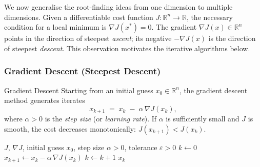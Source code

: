 We now generalise the root-finding ideas from one dimension to multiple dimensions. Given a differentiable cost function $J\colon\mathbb{R}^n\to\mathbb{R}$, the necessary condition for a local minimum is $\nabla J(x^*)=0$. The gradient $\nabla J(x)\in\mathbb{R}^n$ points in the direction of steepest \emph{ascent}; its negative $-\nabla J(x)$ is the direction of steepest \emph{descent}. This observation motivates the iterative algorithms below.

\subsubsection{Gradient Descent (Steepest Descent)}

\begin{defnbox}{Gradient Descent}
	Starting from an initial guess $x_0\in\mathbb{R}^n$, the gradient descent method generates iterates
	\[
	x_{k+1} \;=\; x_k \;-\; \alpha\,\nabla J(x_k),
	\]
	where $\alpha>0$ is the \emph{step size} (or \emph{learning rate}). If $\alpha$ is sufficiently small and $J$ is smooth, the cost decreases monotonically: $J(x_{k+1})<J(x_k)$.
\end{defnbox}

\begin{algorithm}[H]
\caption{Gradient Descent}\label{alg:gradient_descent}
\begin{algorithmic}[1]
\Require $J$, $\nabla J$, initial guess $x_0$, step size $\alpha>0$, tolerance $\varepsilon>0$
\State $k \gets 0$
    \State $x_{k+1} \gets x_k - \alpha\,\nabla J(x_k)$
    \State $k \gets k+1$
\EndWhile
\State \Return $x_k$
\end{algorithmic}
\end{algorithm}

